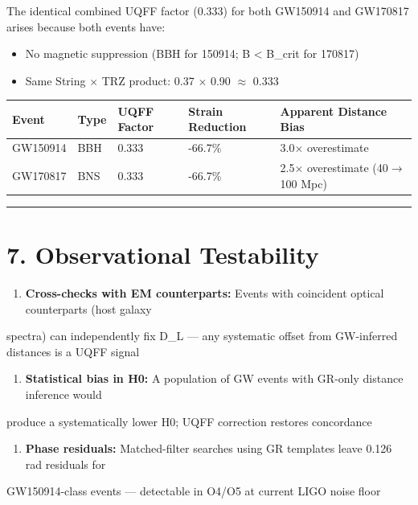 \documentclass[11pt]{article}
\begin{document}
The identical combined UQFF factor (0.333) for both GW150914 and GW170817 arises because both events have:

\begin{itemize}
  \item No magnetic suppression (BBH for 150914; B < B\_crit for 170817)
  \item Same String $\times$ TRZ product: 0.37 $\times$ 0.90 $\approx$ 0.333
\end{itemize}

\begin{center}
\begin{longtable}{lllll}
\toprule
Event & Type & UQFF Factor & Strain Reduction & Apparent Distance Bias \tabularnewline
\midrule
\endhead
GW150914 & BBH & 0.333 & -66.7\% & 3.0$\times$ overestimate \tabularnewline
GW170817 & BNS & 0.333 & -66.7\% & 2.5$\times$ overestimate (40$\to$100 Mpc) \tabularnewline
\bottomrule
\end{longtable}
\end{center}

\noindent\rule{\textwidth}{0.4pt}

\section*{7. Observational Testability}

\begin{enumerate}
  \item \textbf{Cross-checks with EM counterparts:} Events with coincident optical counterparts (host galaxy
\end{enumerate}

spectra) can independently fix D\_L --- any systematic offset from GW-inferred distances is a UQFF signal

\begin{enumerate}
  \item \textbf{Statistical bias in H0:} A population of GW events with GR-only distance inference would
\end{enumerate}

produce a systematically lower H0; UQFF correction restores concordance

\begin{enumerate}
  \item \textbf{Phase residuals:} Matched-filter searches using GR templates leave 0.126 rad residuals for
\end{enumerate}

GW150914-class events --- detectable in O4/O5 at current LIGO noise floor
\end{document}
